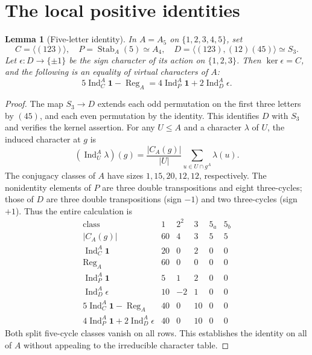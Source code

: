 \documentclass[11pt]{article}
\newtheorem{lemma}[theorem]{Lemma}
\theoremstyle{remark}\newtheorem{remark}[theorem]{Remark}
\newcommand{\Ind}{\operatorname{Ind}}
\newcommand{\Reg}{\operatorname{Reg}}
\newcommand{\one}{\mathbf{1}}
\begin{document}
\section{The local positive identities}
\begin{lemma}[Five-letter identity]\label{lem:a5}
In $A=A_5$ on $\{1,2,3,4,5\}$, set
\[
 C=\langle(123)\rangle,\quad P=\operatorname{Stab}_A(5)\simeq A_4,\quad
 D=\langle(123),(12)(45)\rangle\simeq S_3.
\]
Let $\epsilon:D\to\{\pm1\}$ be the sign character of its action on
$\{1,2,3\}$. Then $\ker\epsilon=C$, and the following is an equality of virtual
characters of $A$:
\begin{equation}\label{eq:a5}
 5\Ind_C^A\one-\Reg_A=4\Ind_P^A\one+2\Ind_D^A\epsilon.
\end{equation}
\end{lemma}
\begin{proof}
The map $S_3\to D$ extends each odd permutation on the first three letters by
$(45)$, and each even permutation by the identity. This identifies $D$ with
$S_3$ and verifies the kernel assertion. For any $U\le A$ and a character $\lambda$
of $U$, the induced character at $g$ is
\begin{equation}\label{eq:ind}
 (\Ind_U^A\lambda)(g)=\frac{|C_A(g)|}{|U|}
    \sum_{u\in U\cap g^A}\lambda(u).
\end{equation}
The conjugacy classes of $A$ have sizes $1,15,20,12,12$, respectively. The
nonidentity elements of $P$ are three double transpositions and eight
three-cycles; those of $D$ are three double transpositions (sign $-1$) and
 two three-cycles (sign $+1$). Thus the entire calculation is
\[
\begin{array}{c|rrrrr}
\text{class}&1&2^2&3&5_a&5_b\\\hline
|C_A(g)|&60&4&3&5&5\\
\Ind_C^A\one&20&0&2&0&0\\
\Reg_A&60&0&0&0&0\\
\Ind_P^A\one&5&1&2&0&0\\
\Ind_D^A\epsilon&10&-2&1&0&0\\\hline
5\Ind_C^A\one-\Reg_A&40&0&10&0&0\\
4\Ind_P^A\one+2\Ind_D^A\epsilon&40&0&10&0&0
\end{array}
\]
Both split five-cycle classes vanish on all rows. This establishes the identity
on all of $A$ without appealing to the irreducible character table.
\end{proof}
\end{document}
